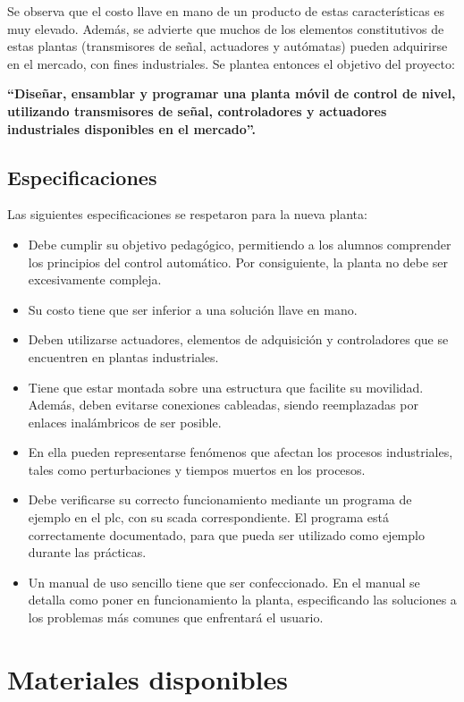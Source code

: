 Se observa que el costo llave en mano de un producto de estas características
es muy elevado.
Además, se advierte que muchos de los elementos constitutivos de estas plantas
(transmisores de señal, actuadores y autómatas) pueden adquirirse en el mercado, con fines
industriales.
Se plantea entonces el objetivo del proyecto:

\textbf{``Diseñar, ensamblar y programar una planta móvil de control de nivel,
utilizando transmisores de señal, controladores y actuadores industriales disponibles en el
mercado''.}

\subsection{Especificaciones}
\label{subsec:especificaciones}

Las siguientes especificaciones se respetaron para la nueva planta:

\begin{itemize}
\item Debe cumplir su objetivo pedagógico, permitiendo
 a los alumnos comprender los principios del control automático.
 Por consiguiente, la planta no debe ser excesivamente compleja.
 \item Su costo tiene que ser inferior a una solución llave en mano.
 \item Deben utilizarse actuadores, elementos de adquisición
 y controladores que se encuentren en plantas industriales.
 \item Tiene que estar montada sobre una estructura que facilite su
movilidad. Además, deben evitarse conexiones cableadas, siendo reemplazadas
por enlaces inalámbricos de ser posible.
 \item En ella pueden representarse fenómenos que
afectan los procesos industriales, tales como perturbaciones y
tiempos muertos en los procesos.
 \item Debe verificarse su correcto funcionamiento mediante un programa de
ejemplo en el \gls{plc}, con su \gls{scada} correspondiente.
El programa está correctamente documentado, para que pueda ser
utilizado como ejemplo durante las prácticas.
 \item Un manual de uso sencillo tiene que ser confeccionado.
 En el manual se detalla como poner en funcionamiento la planta,
especificando las soluciones a los problemas más comunes que enfrentará el
usuario.
\end{itemize}

\section{Materiales disponibles}
\label{sec:MaterialesDisponibles}

